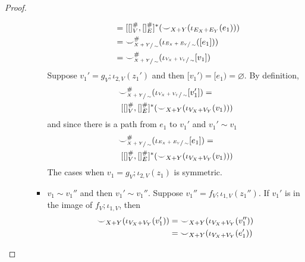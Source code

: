 \begin{proof}
\begin{itemize}
\begin{itemize}
\begin{itemize}
\begin{align*}
                                                                                                                     &\;= [[]_{V}^{{\#}},[]_{E}^{{\#}}]^{*}({\smile}_{X+Y}(\iota_{E_{X} + E_{Y}}(e_1)))\\
                                                                                                                     &\;= {\smile}_{\sfrac{X+Y}{\sim}}^{{\#}}(\iota_{\sfrac{E_{X} + E_{Y}}{\sim}}([e_1]))\\
                                                                                                                     &\;= {\smile}_{\sfrac{X+Y}{\sim}}^{{\#}}(\iota_{\sfrac{V_{X} + V_{Y}}{\sim}}[v_1])
                            \end{align*}
                            Suppose $v_1' = g_{V};\iota_{2,V}(z_1')$ and then $[v_1') = [e_1) = \varnothing$.
                            By definition,
                            \begin{align*}
                                &{\smile}_{\sfrac{X+Y}{\sim}}^{{\#}}(\iota_{\sfrac{V_{X} + V_{Y}}{\sim}}[v_1']) =\\
                                &\;[[]_{V}^{{\#}},[]_{E}^{{\#}}]^{*}({\smile}_{X+Y}(\iota_{V_{X} + V_{Y}}(v_1)))
                            \end{align*}
                            and since there is a path from $e_1$ to $v_1'$ and $v_1' \sim v_1$
                            \begin{align*}
                                &{\smile}_{\sfrac{X+Y}{\sim}}^{{\#}}(\iota_{\sfrac{E_{X} + E_{Y}}{\sim}}[e_1]) =\\
                                &\;[[]_{V}^{{\#}},[]_{E}^{{\#}}]^{*}({\smile}_{X+Y}(\iota_{V_{X} + V_{Y}}(v_1)))
                            \end{align*}
                            The cases when $v_1 = g_{V};\iota_{2,V}(z_1)$ is symmetric.
                        \item $v_1 \sim v_1''$ and then $v_1' \sim v_1''$. Suppose $v_1'' = f_{V};\iota_{1,V}(z_1'')$.
                              If $v_1'$ is in the image of $f_{V};\iota_{1,V}$, then
                              \begin{align*}
                                \consistency_{X+Y}(\iota_{V_{X} + V_{Y}}(v_1')) &= \consistency_{X+Y}(\iota_{V_{X} + V_{Y}}(v_1''))\\ 
                                                                               &= \consistency_{X+Y}(\iota_{V_{X} + V_{Y}}(e_1'))

\end{align*}
\end{itemize}
\end{itemize}
\end{itemize}
\end{proof}
